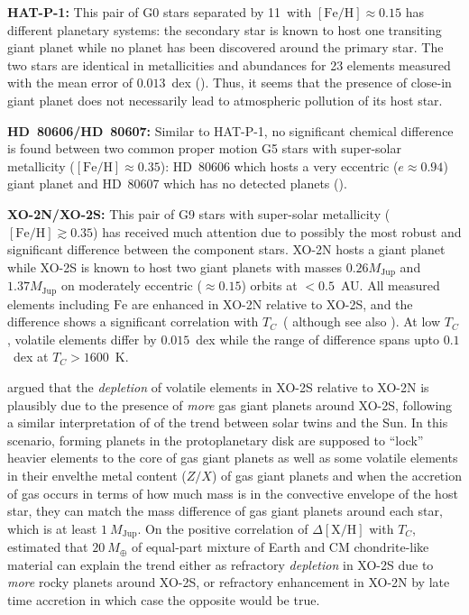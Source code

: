 \documentclass[modern, letterpaper]{aastex61}
\newcommand*\elem[1]{\ensuremath{\mathrm{#1}}}
\newcommand*\elemH[1]{\ensuremath{[\mathrm{#1}/\elem{H}]}}
\newcommand*{\feh}{\ensuremath{\elemH{Fe}}}
\newcommand{\Tcondens}{\ensuremath{T_C}}
\newcommand{\mearth}{\ensuremath{M_\oplus}}
\newcommand{\mjupiter}{\ensuremath{M_\mathrm{Jup}}}
\begin{document}
{\bf HAT-P-1:}
This pair of G0 stars separated by 11\arcsec\ with $\feh\approx0.15$ has
different planetary systems:
the secondary star is known to host one transiting giant planet
while no planet has been discovered around the primary star.
The two stars are identical
in metallicities and abundances for 23 elements measured with
the mean error of $0.013$~dex (\citealt{Liu:2014aa}).
Thus, it seems that the presence of close-in giant planet does not necessarily
lead to atmospheric pollution of its host star.

{\bf HD~80606/HD~80607:}
Similar to HAT-P-1, no significant chemical difference is found between two
common proper motion G5 stars with super-solar metallicity ($\feh \approx
0.35$): HD~80606 which hosts a very eccentric ($e\approx0.94$) giant planet and
HD~80607 which has no detected planets (\citealt{Saffe:2015aa,Mack:2016aa}).

{\bf XO-2N/XO-2S:}
This pair of G9 stars with super-solar metallicity ($\feh \gtrsim 0.35$)
has received much attention due to possibly the most robust and significant
difference between the component stars.
XO-2N hosts a giant planet while XO-2S is known to host two giant planets with
masses $0.26 \mjupiter$ and $1.37 \mjupiter$ on moderately eccentric ($\approx
0.15$) orbits at $<0.5$~AU.
All measured elements including \elem{Fe} are enhanced in XO-2N relative to
XO-2S, and the difference shows a significant correlation with \Tcondens\
(\citealt{Teske:2015aa,Ramirez:2015aa,Biazzo:2015aa} although see also
\citealt{Teske:2013aa}).
At low \Tcondens, volatile elements differ by $0.015$~dex while the range of
difference spans upto $0.1$~dex at $\Tcondens>1600$~K.

\citealt{Ramirez:2015aa} argued that the {\it depletion} of volatile elements
in XO-2S relative to XO-2N is plausibly due to the presence of {\it more} gas
giant planets around XO-2S, following a similar interpretation of
\citealt{Melendez:2009aa} of the trend between solar twins and the Sun.
In this scenario, forming planets in the protoplanetary disk are supposed to
``lock'' heavier elements to the core of gas giant planets as well as some
volatile elements in their envelthe metal content ($Z/X$) of gas giant planets and when the accretion
of gas occurs in terms of how much mass is in the convective envelope of the
host star, they can match the mass difference of gas giant planets around each
star, which is at least $1~\mjupiter$.
On the positive correlation of $\Delta\elemH{X}$ with \Tcondens,
\citealt{Ramirez:2015aa} estimated that $20~\mearth$ of equal-part mixture of
Earth and CM chondrite-like material can explain the trend either as refractory
{\it depletion} in XO-2S due to {\it more} rocky planets around XO-2S, or
refractory enhancement in XO-2N by late time accretion in which case the
opposite would be true.
\end{document}
